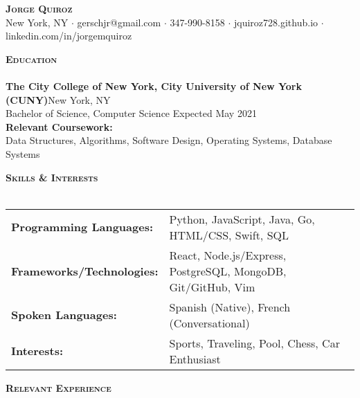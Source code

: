\documentclass[a4paper]{article}
\newcommand{\lineunder} {
    \vspace*{-8pt} \\
    \hspace*{-18pt} \hrulefill \\
}
\newcommand{\header} [1] {
    {\hspace*{-18pt}\vspace*{6pt} \textsc{#1}}
    \vspace*{-6pt} \lineunder
}
\begin{document}
\vspace*{-40pt}

    

\vspace*{-20pt}
\begin{center}
	{\Huge \scshape {\textbf{Jorge Quiroz}}}\\
    \vspace{1mm}
	New York, NY $\cdot$ gerschjr@gmail.com $\cdot$ 347-990-8158 $\cdot$ jquiroz728.github.io $\cdot$ linkedin.com/in/jorgemquiroz\\
\end{center}

\header{\textbf{Education}}
\textbf{The City College of New York, City University of New York (CUNY)}\hfill New York, NY\\
Bachelor of Science, Computer Science \hfill  Expected May 2021\\
\textbf{Relevant Coursework:} \\
Data Structures, Algorithms, Software Design, Operating Systems, Database Systems
\vspace{2mm}

\header{\textbf{Skills \& Interests}}
\vspace{1mm}
\begin{tabular}{ l l }
	\textbf{Programming Languages:}   & Python, JavaScript, Java, Go, HTML/CSS, Swift, SQL                  \\
	\textbf{Frameworks/Technologies:} & React, Node.js/Express, PostgreSQL, MongoDB, Git/GitHub, Vim \\
	\textbf{Spoken Languages:}        & Spanish (Native), French (Conversational)                    \\
	\textbf{Interests:}               & Sports, Traveling, Pool, Chess, Car Enthusiast           \\
\end{tabular}
\vspace{2mm}

\header{\textbf{Relevant Experience}}
\vspace{1mm}
\end{document}
